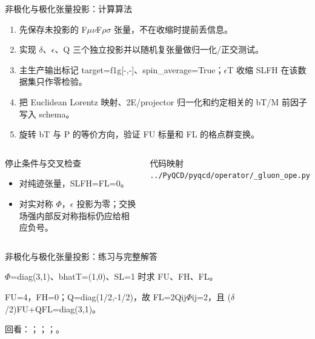 \begin{frame}[t]{非极化与极化张量投影：计算算法}
\footnotesize
{}\begin{enumerate}
\item 先保存未投影的 F\ensuremath{\mu}\ensuremath{\nu}F\ensuremath{\rho}\ensuremath{\sigma} 张量，不在收缩时提前丢信息。
\item 实现 \ensuremath{\delta}、\ensuremath{\epsilon}、Q 三个独立投影并以随机复张量做归一化/\allowbreak{}正交测试。
\item 主生产输出标记 target=f1g[-,-]、spin\_average=True；\ensuremath{\epsilon}T 收缩 SLFH 在该数据集只作零检验。
\item 把 Euclidean Lorentz 映射、2E/\allowbreak{}projector 归一化和约定相关的 bT/\allowbreak{}M 前因子写入 schema。
\item 旋转 bT 与 P 的等价方向，验证 FU 标量和 FL 的格点群变换。
\end{enumerate}\begin{columns}[T,onlytextwidth]
\begin{block}{停止条件与交叉检查}\scriptsize\begin{itemize}
\item[\CheckMark] 对纯迹张量，SLFH=FL=0。
\item[\CheckMark] 对实对称 \ensuremath{\Phi}，\ensuremath{\epsilon} 投影为零；交换场强内部反对称指标仍应给相应负号。
\end{itemize}\end{block}
\begin{block}{代码映射}
\scriptsize \texttt{.\allowbreak{}.\allowbreak{}/\allowbreak{}PyQCD/\allowbreak{}pyqcd/\allowbreak{}operator/\allowbreak{}\_\allowbreak{}gluon\_\allowbreak{}ope.\allowbreak{}py}
\end{block}\end{columns}\end{frame}

\begin{frame}[t]{非极化与极化张量投影：练习与完整解答}
\footnotesize
\begin{block}{}\ensuremath{\Phi}=diag(3,1)、bhatT=(1,0)、SL=1 时求 FU、FH、FL。\end{block}
\begin{exampleblock}{}FU=4，FH=0；Q=diag(1/\allowbreak{}2,-1/\allowbreak{}2)，故 FL=2Qij\ensuremath{\Phi}ij=2，且 (\ensuremath{\delta}/\allowbreak{}2)FU+QFL=diag(3,1)。\end{exampleblock}
\vfill
\scriptsize 回看：；；；。
\end{frame}

